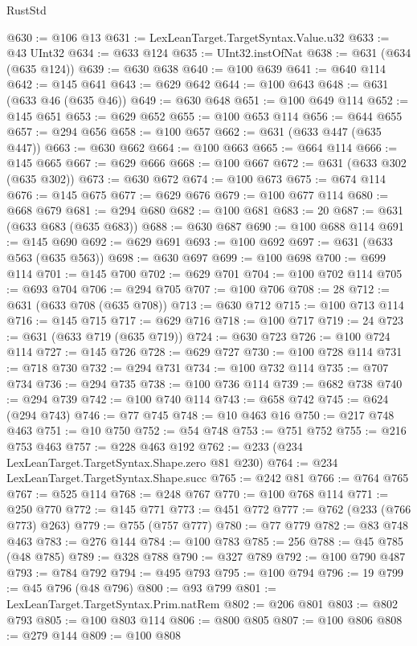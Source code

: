\begin{lexlean}{RustStd}
\begin{coremodule}
@630 := @106 @13
@631 := LexLeanTarget.TargetSyntax.Value.u32
@633 := @43 UInt32
@634 := @633 @124
@635 := UInt32.instOfNat
@638 := @631 (@634 (@635 @124))
@639 := @630 @638
@640 := @100 @639
@641 := @640 @114
@642 := @145 @641
@643 := @629 @642
@644 := @100 @643
@648 := @631 (@633 @46 (@635 @46))
@649 := @630 @648
@651 := @100 @649 @114
@652 := @145 @651
@653 := @629 @652
@655 := @100 @653 @114
@656 := @644 @655
@657 := @294 @656
@658 := @100 @657
@662 := @631 (@633 @447 (@635 @447))
@663 := @630 @662
@664 := @100 @663
@665 := @664 @114
@666 := @145 @665
@667 := @629 @666
@668 := @100 @667
@672 := @631 (@633 @302 (@635 @302))
@673 := @630 @672
@674 := @100 @673
@675 := @674 @114
@676 := @145 @675
@677 := @629 @676
@679 := @100 @677 @114
@680 := @668 @679
@681 := @294 @680
@682 := @100 @681
@683 := 20
@687 := @631 (@633 @683 (@635 @683))
@688 := @630 @687
@690 := @100 @688 @114
@691 := @145 @690
@692 := @629 @691
@693 := @100 @692
@697 := @631 (@633 @563 (@635 @563))
@698 := @630 @697
@699 := @100 @698
@700 := @699 @114
@701 := @145 @700
@702 := @629 @701
@704 := @100 @702 @114
@705 := @693 @704
@706 := @294 @705
@707 := @100 @706
@708 := 28
@712 := @631 (@633 @708 (@635 @708))
@713 := @630 @712
@715 := @100 @713 @114
@716 := @145 @715
@717 := @629 @716
@718 := @100 @717
@719 := 24
@723 := @631 (@633 @719 (@635 @719))
@724 := @630 @723
@726 := @100 @724 @114
@727 := @145 @726
@728 := @629 @727
@730 := @100 @728 @114
@731 := @718 @730
@732 := @294 @731
@734 := @100 @732 @114
@735 := @707 @734
@736 := @294 @735
@738 := @100 @736 @114
@739 := @682 @738
@740 := @294 @739
@742 := @100 @740 @114
@743 := @658 @742
@745 := @624 (@294 @743)
@746 := @77 @745
@748 := @10 @463 @16
@750 := @217 @748 @463
@751 := @10 @750
@752 := @54 @748
@753 := @751 @752
@755 := @216 @753 @463
@757 := @228 @463 @192
@762 := @233 (@234 LexLeanTarget.TargetSyntax.Shape.zero @81 @230)
@764 := @234 LexLeanTarget.TargetSyntax.Shape.succ
@765 := @242 @81
@766 := @764 @765
@767 := @525 @114
@768 := @248 @767
@770 := @100 @768 @114
@771 := @250 @770
@772 := @145 @771
@773 := @451 @772
@777 := @762 (@233 (@766 @773) @263)
@779 := @755 (@757 @777)
@780 := @77 @779
@782 := @83 @748 @463
@783 := @276 @144
@784 := @100 @783
@785 := 256
@788 := @45 @785 (@48 @785)
@789 := @328 @788
@790 := @327 @789
@792 := @100 @790 @487
@793 := @784 @792
@794 := @495 @793
@795 := @100 @794
@796 := 19
@799 := @45 @796 (@48 @796)
@800 := @93 @799
@801 := LexLeanTarget.TargetSyntax.Prim.natRem
@802 := @206 @801
@803 := @802 @793
@805 := @100 @803 @114
@806 := @800 @805
@807 := @100 @806
@808 := @279 @144
@809 := @100 @808

\end{coremodule}
\end{lexlean}
